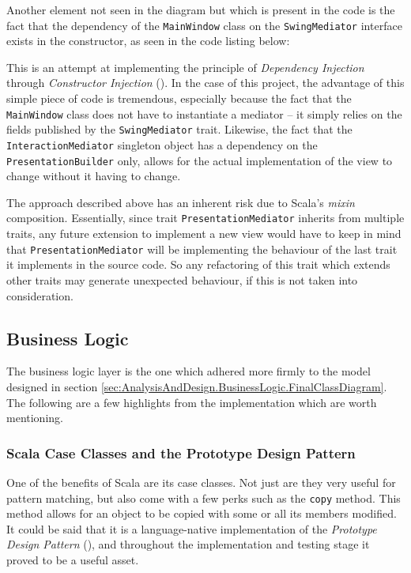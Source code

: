 Another element not seen in the diagram but which is present in the code is the
fact that the dependency of the \texttt{MainWindow} class on the
\texttt{SwingMediator} interface exists in the constructor, as seen in the code
listing below:
{
  \small
  
}

This is an attempt at implementing the principle of \emph{Dependency Injection}
through \emph{Constructor Injection} (\cite[][]{fowler2004inversion}). In the
case of this project, the advantage of this simple piece of code is tremendous,
especially because the fact that the \texttt{MainWindow} class does not have to
instantiate a mediator -- it simply relies on the fields published by the
\texttt{SwingMediator} trait. Likewise, the fact that the
\texttt{InteractionMediator} singleton object has a dependency on the
\texttt{PresentationBuilder} only, allows for the actual implementation of the
view to change without it having to change.


The approach described above has an inherent risk due to Scala's \emph{mixin}
composition. Essentially, since trait \texttt{PresentationMediator} inherits
from multiple traits, any future extension to implement a new view would have
to keep in mind that \texttt{PresentationMediator} will be implementing the
behaviour of the last trait it implements in the source code. So any
refactoring of this trait which extends other traits may generate unexpected
behaviour, if this is not taken into consideration.


\subsection{Business Logic} \label{sec:Implementation.BusinessLogic}

The business logic layer is the one which adhered more firmly to the model
designed in section
\ref{sec:AnalysisAndDesign.BusinessLogic.FinalClassDiagram}. The following are
a few highlights from the implementation which are worth mentioning.

\subsubsection{Scala Case Classes and the Prototype Design Pattern} \label{sec:Implementation.ScalaCaseClasses}
One of the benefits of Scala are its case classes. Not just are they very
useful for pattern matching, but also come with a few perks such as the
\texttt{copy} method. This method allows for an object to be copied with some
or all its members modified. It could be said that it is a language-native
implementation of the \emph{Prototype Design Pattern}
(\cite[][Ch.~6,~Location~2461]{nikolov2016scala}), and throughout the
implementation and testing stage it proved to be a useful asset.

